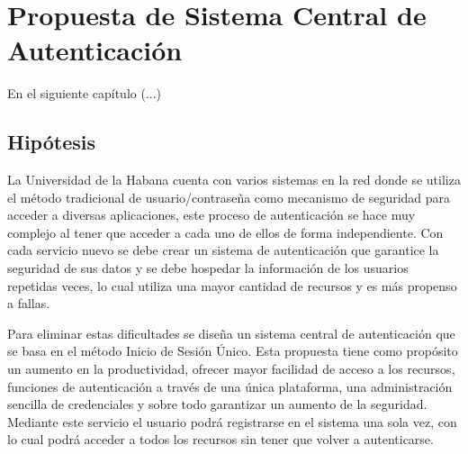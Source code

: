 \chapter{Propuesta de Sistema Central de Autenticación}\label{chapter:proposal}
En el siguiente capítulo (...)
\section*{Hipótesis}
La Universidad de la Habana cuenta con varios sistemas en la red donde se utiliza el método tradicional de usuario/contraseña como mecanismo de seguridad para acceder a diversas aplicaciones, este proceso de autenticación se hace muy complejo al tener que acceder a cada uno de ellos de forma independiente. Con cada servicio nuevo se debe crear un sistema de autenticación que garantice la seguridad de sus datos y se debe hospedar la información de los usuarios repetidas veces, lo cual utiliza una mayor cantidad de recursos y es más propenso a fallas.

Para eliminar estas dificultades se diseña un sistema central de autenticación que se basa en el método Inicio de Sesión Único. Esta propuesta tiene como propósito un aumento en la productividad, ofrecer mayor facilidad de acceso a los recursos, funciones de autenticación a través de una única plataforma, una administración sencilla de credenciales y sobre todo garantizar un aumento de la seguridad. Mediante este servicio el usuario podrá registrarse en el sistema una sola vez, con lo cual podrá acceder a todos los recursos sin tener que volver a autenticarse.


